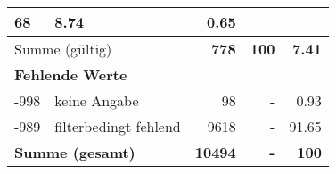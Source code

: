\begin{longtable}{lXrrr}
       \num{68} &
       \num[round-mode=places,round-precision=2]{8,74} &
         \num[round-mode=places,round-precision=2]{0,65} \\
     \midrule
     \multicolumn{2}{l}{Summe (gültig)} &
       \textbf{\num{778}} &
     \textbf{100} &
       \textbf{\num[round-mode=places,round-precision=2]{7,41}} \\
     \multicolumn{5}{l}{\textbf{Fehlende Werte}}\\
       -998 &
       keine Angabe &
         \num{98} &
        - &
         \num[round-mode=places,round-precision=2]{0,93} \\
       -989 &
       filterbedingt fehlend &
         \num{9618} &
        - &
         \num[round-mode=places,round-precision=2]{91,65} \\
     \midrule
     \multicolumn{2}{l}{\textbf{Summe (gesamt)}} &
          \textbf{\num{10494}} &
        \textbf{-} &
        \textbf{100} \\
     \bottomrule
     \end{longtable}
     

